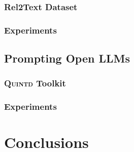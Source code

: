\documentclass[12pt,notitlepage,a4paper,openright]{report}
\begin{document}
\subsection{Rel2Text Dataset}
\label{sec:rel2text}
\subsection{Experiments}
\label{sec:rel2text-exp}
\section{Prompting Open LLMs}
\label{sec:prompting}
\subsection{\textsc{Quintd} Toolkit}
\label{sec:quintd}
\subsection{Experiments}
\label{sec:quintd-exp}




\chapter{Conclusions}
\label{chap:conclusions}


%
%

\renewcommand{\chapterheadstartvskip}{\vspace*{0mm}} %

\cleardoublepage{}

{\small }

\cleardoublepage{}
\renewcommand*{\acronymname}{List of Abbreviations}
\printglossary[type=\acronymtype,style=index]

{\small \listoftables\par}

{\small \listoffigures\par}

\cleardoublepage{}

\end{document}
